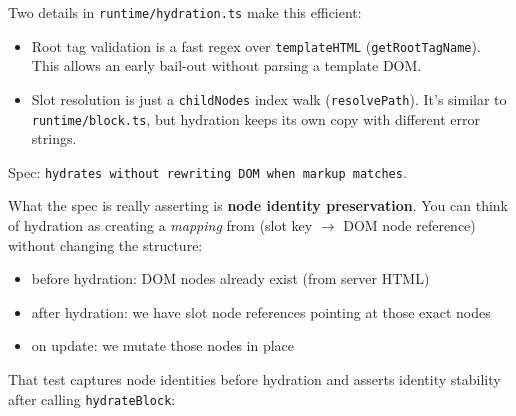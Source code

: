 Two details in \texttt{runtime/hydration.ts} make this efficient:

\begin{itemize}
  \item Root tag validation is a fast regex over \texttt{templateHTML} (\texttt{getRootTagName}). This allows an early bail-out without parsing a template DOM.
  \item Slot resolution is just a \texttt{childNodes} index walk (\texttt{resolvePath}). It’s similar to \texttt{runtime/block.ts}, but hydration keeps its own copy with different error strings.
\end{itemize}

Spec: \texttt{hydrates without rewriting DOM when markup matches}.

What the spec is really asserting is \textbf{node identity preservation}. You can think of hydration as creating a \emph{mapping} from (slot key \(\rightarrow\) DOM node reference) without changing the structure:

\begin{itemize}
  \item before hydration: DOM nodes already exist (from server HTML)
  \item after hydration: we have slot node references pointing at those exact nodes
  \item on update: we mutate those nodes in place
\end{itemize}

\begin{center}
\end{center}

That test captures node identities before hydration and asserts identity stability after calling \texttt{hydrateBlock}:

